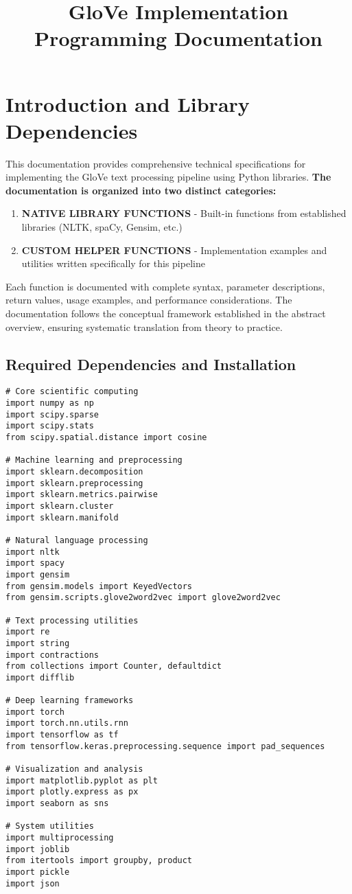 \documentclass[11pt,a4paper]{article}
\title{GloVe Implementation Programming Documentation}
\author{}
\date{}
\begin{document}
\maketitle

\section{Introduction and Library Dependencies}

This documentation provides comprehensive technical specifications for implementing the GloVe text processing pipeline using Python libraries. \textbf{The documentation is organized into two distinct categories:}

\begin{enumerate}
\item \textbf{\textcolor{nativecolor}{NATIVE LIBRARY FUNCTIONS}} - Built-in functions from established libraries (NLTK, spaCy, Gensim, etc.)
\item \textbf{\textcolor{customcolor}{CUSTOM HELPER FUNCTIONS}} - Implementation examples and utilities written specifically for this pipeline
\end{enumerate}

Each function is documented with complete syntax, parameter descriptions, return values, usage examples, and performance considerations. The documentation follows the conceptual framework established in the abstract overview, ensuring systematic translation from theory to practice.

\subsection{Required Dependencies and Installation}

\begin{lstlisting}[caption=Required library imports]
# Core scientific computing
import numpy as np
import scipy.sparse
import scipy.stats
from scipy.spatial.distance import cosine

# Machine learning and preprocessing
import sklearn.decomposition
import sklearn.preprocessing
import sklearn.metrics.pairwise
import sklearn.cluster
import sklearn.manifold

# Natural language processing
import nltk
import spacy
import gensim
from gensim.models import KeyedVectors
from gensim.scripts.glove2word2vec import glove2word2vec

# Text processing utilities
import re
import string
import contractions
from collections import Counter, defaultdict
import difflib

# Deep learning frameworks
import torch
import torch.nn.utils.rnn
import tensorflow as tf
from tensorflow.keras.preprocessing.sequence import pad_sequences

# Visualization and analysis
import matplotlib.pyplot as plt
import plotly.express as px
import seaborn as sns

# System utilities
import multiprocessing
import joblib
from itertools import groupby, product
import pickle
import json
\end{lstlisting}
\end{document}
